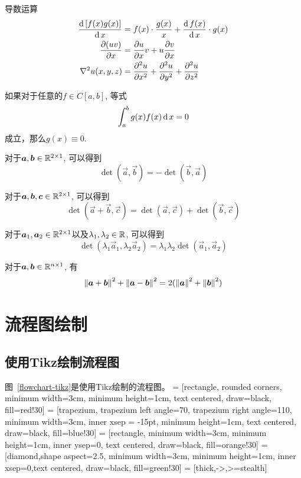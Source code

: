 \begin{example} 导数运算
\begin{align}
\frac{\operatorname{\mathrm{d}} {[f(x)g(x)]}}{\operatorname{\mathrm{d}} {x}} 
&= f(x)\cdot \frac{g(x)}{x} + \frac{\operatorname{\mathrm{d}} {f(x)}}{\operatorname{\mathrm{d}} {x}}\cdot g(x) \\
\frac{\partial {(uv)}}{\partial {x}}& = \frac{\partial {u}}{\partial {x}}v + u\frac{\partial {v}}{\partial {x}}\\
\nabla^2u(x,y,z)& = \frac{\partial^2 {u}}{\partial {x}^2} + \frac{\partial^2 {u}}{\partial {y}^2} +\frac{\partial^2 {u}}{\partial {z}^2}
\end{align}
\end{example}

\begin{lemma} 如果对于任意的$f\in C[a,b]$, 等式
$$
\int^b_a g(x) f(x)\operatorname{\mathrm{d}} x = 0
$$
成立，那么$g(x)\equiv 0$.
\end{lemma}

\begin{property}[反对称性]
对于$\bm{a},\bm{b}\in \mathbb{R}^{{2}\times {1}}$, 可以得到
$$
\det(\vec{a},\vec{b}) = - \det(\vec{b},\vec{a})
$$
\end{property}

\begin{property}[可加性]
对于$\bm{a},\bm{b},\bm{c}\in \mathbb{R}^{{2}\times {1}}$, 可以得到
$$
\det(\vec{a}+\vec{b},\vec{c}) = \det(\vec{a},\vec{c}) +\det(\vec{b},\vec{c})
$$
\end{property}

\begin{property}[多重线性]
对于$\bm{a}_1,\bm{a}_2\in \mathbb{R}^{{2}\times {1}}$以及$\lambda_1, \lambda_2\in\mathbb{R}$, 可以得到
$$
\det(\lambda_1\vec{a}_1,\lambda_2\vec{a}_2) = \lambda_1\lambda_2 \det(\vec{a}_1,\vec{a}_2)
$$
\end{property}


\begin{corollary}
对于$\bm{a},\bm{b}\in \mathbb{R}^{{n}\times {1}}$, 有
$$
\left\lVert \bm{a}+\bm{b} \right\rVert^2 + \left\lVert \bm{a}-\bm{b} \right\rVert^2 =2(\left\lVert \bm{a} \right\rVert^2 +\left\lVert \bm{b} \right\rVert^2)
$$
\end{corollary}



\section{流程图绘制}
\subsection{使用Tikz绘制流程图}
图~\ref{flowchart-tikz}是使用Tikz绘制的流程图。
\usetikzlibrary{shapes.geometric,arrows}
\usetikzlibrary{fit}
\usetikzlibrary{backgrounds}
 = [rectangle, rounded corners, minimum width=3cm, minimum height=1cm, text centered, draw=black, fill=red!30]
        = [trapezium, trapezium left angle=70, trapezium right angle=110, minimum width=3cm, inner xsep = -15pt, minimum height=1cm, text centered, draw=black, fill=blue!30]
   = [rectangle, minimum width=3cm, minimum height=1cm, inner ysep=0, text centered, draw=black, fill=orange!30]
  = [diamond,shape aspect=2.5, minimum width=3cm, minimum height=1cm, inner xsep=0,text centered, draw=black, fill=green!30]
     = [thick,->,>=stealth]

